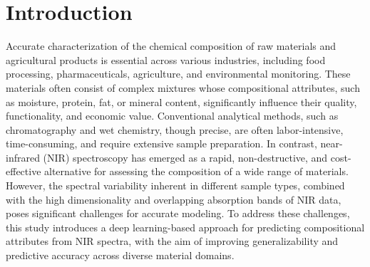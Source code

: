 \documentclass[10pt, a4paper, oneside]{article}
\begin{document}
{\selectfont
\begin{keywords}
{\fontsize{9pt}{9pt}\selectfont{Near infrared spectroscopy, Food product analysis, Multi-scale feature extraction, Deep Learning, NirMACNet}}
\end{keywords}}

{\selectfont
\begin{category}
{\fontsize{9pt}{9pt}\selectfont{
H.3.1, H.3.2, H.3.3, H.3.7, H.5.1}}
\end{category}}

{\selectfont
\begin{doi}
{\fontsize{9pt}{9pt}\selectfont{
10.3897/jucs.143527}}
\end{doi}}

\section{Introduction}
Accurate characterization of the chemical composition of raw materials and agricultural products is essential across various industries, including food processing, pharmaceuticals, agriculture, and environmental monitoring. These materials often consist of complex mixtures whose compositional attributes, such as moisture, protein, fat, or mineral content, significantly influence their quality, functionality, and economic value. Conventional analytical methods, such as chromatography and wet chemistry, though precise, are often labor-intensive, time-consuming, and require extensive sample preparation. In contrast, near-infrared (NIR) spectroscopy has emerged as a rapid, non-destructive, and cost-effective alternative for assessing the composition of a wide range of materials. However, the spectral variability inherent in different sample types, combined with the high dimensionality and overlapping absorption bands of NIR data, poses significant challenges for accurate modeling. To address these challenges, this study introduces a deep learning-based approach for predicting compositional attributes from NIR spectra, with the aim of improving generalizability and predictive accuracy across diverse material domains.
\end{document}
